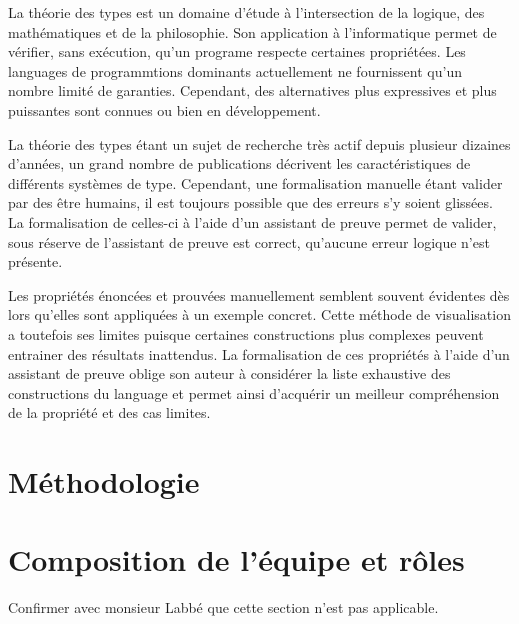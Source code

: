\documentclass[letterpaper
, twoside
, 12pt
,these
,francais
,creativecommons,hyperref
]{thETS}
\begin{document}
La théorie des types est un domaine d'étude à l'intersection de la logique, des mathématiques et de
la philosophie. Son application à l'informatique permet de vérifier, sans exécution, qu'un programe
respecte certaines propriétées. Les languages de programmtions dominants actuellement ne fournissent
qu'un nombre limité de garanties. Cependant, des alternatives plus expressives et plus puissantes
sont connues ou bien en développement.

La théorie des types étant un sujet de recherche très actif depuis plusieur dizaines d'années, un
grand nombre de publications décrivent les caractéristiques de différents systèmes de type.
Cependant, une formalisation manuelle étant valider par des être humains, il est toujours possible
que des erreurs s'y soient glissées. La formalisation de celles-ci à l'aide d'un assistant de preuve
permet de valider, sous réserve de l'assistant de preuve est correct, qu'aucune erreur logique n'est
présente.

Les propriétés énoncées et prouvées manuellement semblent souvent évidentes dès lors qu'elles sont
appliquées à un exemple concret. Cette méthode de visualisation a toutefois ses limites puisque
certaines constructions plus complexes peuvent entrainer des résultats inattendus. La formalisation
de ces propriétés à l'aide d'un assistant de preuve oblige son auteur à considérer la liste
exhaustive des constructions du language et permet ainsi d'acquérir un meilleur compréhension de la
propriété et des cas limites.

\chapter{Méthodologie}

%


\chapter{Composition de l'équipe et rôles}

Confirmer avec monsieur Labbé que cette section n'est pas applicable.
\end{document}
